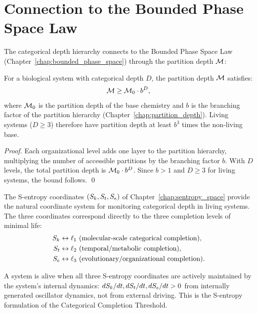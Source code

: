 \section{Connection to the Bounded Phase Space Law}
\label{sec:life_bpsl}

The categorical depth hierarchy connects to the Bounded Phase Space Law
(Chapter~\ref{chap:bounded_phase_space}) through the partition depth $\mathcal{M}$:

\begin{proposition}
\label{prop:depth_connection}
For a biological system with categorical depth $D$, the partition depth
$\mathcal{M}$ satisfies:
\begin{equation}
  \mathcal{M} \geq \mathcal{M}_0 \cdot b^D,
  \label{eq:depth_bound}
\end{equation}
where $\mathcal{M}_0$ is the partition depth of the base chemistry and $b$ is the
branching factor of the partition hierarchy (Chapter~\ref{chap:partition_depth}).
Living systems ($D \geq 3$) therefore have partition depth at least $b^3$ times
the non-living base.
\end{proposition}

\begin{proof}
Each organizational level adds one layer to the partition hierarchy, multiplying
the number of accessible partitions by the branching factor $b$. With $D$ levels,
the total partition depth is $\mathcal{M}_0 \cdot b^D$. Since $b > 1$ and $D \geq 3$
for living systems, the bound follows. \qed
\end{proof}

The S-entropy coordinates $(S_k, S_t, S_e)$ of Chapter~\ref{chap:sentropy_space}
provide the natural coordinate system for monitoring categorical depth in
living systems. The three coordinates correspond directly to the three
completion levels of minimal life:
\begin{align}
  S_k &\leftrightarrow \ell_1 \text{ (molecular-scale categorical completion)}, \\
  S_t &\leftrightarrow \ell_2 \text{ (temporal/metabolic completion)}, \\
  S_e &\leftrightarrow \ell_3 \text{ (evolutionary/organizational completion)}.
  \label{eq:sentropy_life_mapping}
\end{align}

A system is alive when all three S-entropy coordinates are actively maintained
by the system's internal dynamics: $dS_k/dt, dS_t/dt, dS_e/dt > 0$ from
internally generated oscillator dynamics, not from external driving. This is
the S-entropy formulation of the Categorical Completion Threshold.

